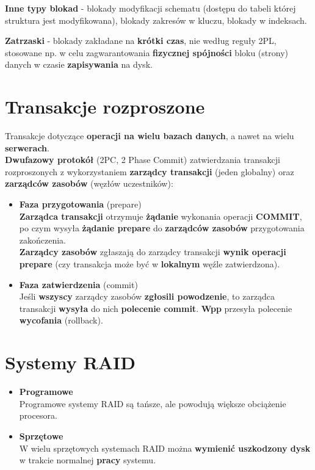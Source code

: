 \documentclass[a4paper]{article}
\begin{document}
\textbf{Inne typy blokad} - blokady modyfikacji schematu (dostępu do tabeli której struktura jest modyfikowana), blokady zakresów w kluczu, blokady w indeksach.

\textbf{Zatrzaski} - blokady zakładane na \textbf{krótki czas}, nie według reguły 2PL, stosowane np. w celu zagwarantowania \textbf{fizycznej spójności} bloku (strony) danych w czasie \textbf{zapisywania} na dysk.

\section{Transakcje rozproszone}
Transakcje dotyczące \textbf{operacji na wielu bazach danych}, a nawet na wielu \textbf{serwerach}.\\

\textbf{Dwufazowy protokół} (2PC, 2 Phase Commit) zatwierdzania transakcji rozproszonych z wykorzystaniem \textbf{zarządcy transakcji} (jeden globalny) oraz \textbf{zarządców zasobów} (węzłów uczestników):
\begin{itemize}
    \item \textbf{Faza przygotowania} (prepare)\\
    \textbf{Zarządca transakcji} otrzymuje \textbf{żądanie} wykonania operacji \textbf{COMMIT}, po czym wysyła \textbf{żądanie prepare} do \textbf{zarządców zasobów} przygotowania zakończenia.\\
    \textbf{Zarządcy zasobów} zgłaszają do zarządcy transakcji \textbf{wynik operacji prepare} (czy transakcja może być w \textbf{lokalnym} węźle zatwierdzona).
    \item \textbf{Faza zatwierdzenia} (commit)\\
    Jeśli \textbf{wszyscy} zarządcy zasobów \textbf{zgłosili powodzenie}, to zarządca transakcji \textbf{wysyła} do nich \textbf{polecenie commit}. \textbf{Wpp} przesyła polecenie \textbf{wycofania} (rollback).
\end{itemize}

\section{Systemy RAID}
\begin{itemize}
    \item \textbf{Programowe}\\
    Programowe systemy RAID są tańsze, ale powodują większe obciążenie procesora.
    \item \textbf{Sprzętowe}\\
    W wielu sprzętowych systemach RAID można \textbf{wymienić uszkodzony dysk} w trakcie normalnej \textbf{pracy} systemu.
\end{itemize}
\end{document}
